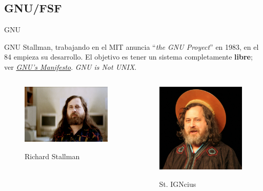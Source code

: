 \documentclass[12pt]{beamer}
\begin{document}
\subsection{GNU/FSF}
\begin{frame}{GNU}
	\begin{block}{GNU}
		Stallman, trabajando en el MIT anuncia ``\textit{the GNU Proyect}'' en 1983, en el 84 empieza su desarrollo. El objetivo es tener un sistema completamente \textbf{libre}; ver \href{https://www.gnu.org/gnu/manifesto.html}{\textit{GNU's Manifesto}}. \textit{GNU is Not UNIX}. 
	\end{block}
	\begin{columns}
		\begin{column}{0.5\textwidth}
			\begin{figure}
				\centering
				\href{https://www.stallman.org/}{\includegraphics[width=\linewidth]{anopensourcelabel}}
				\caption{Richard Stallman}
				\label{fig:anopensourcelabel}
			\end{figure}
		\end{column}
		\begin{column}{0.5\textwidth}
			\begin{figure}
				\centering
				\href{https://www.youtube.com/watch?v=1jPmnDZ6ab8}{\includegraphics[width=0.7\linewidth]{FlICmGnj}}
				\caption{St. IGNcius}
				\label{fig:flicmgnj}
			\end{figure}
		

\end{column}
\end{columns}
\end{frame}
\end{document}
